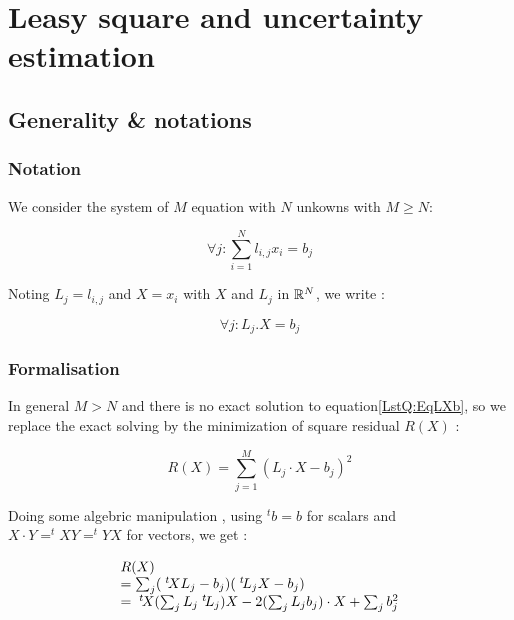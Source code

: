 \chapter{Leasy square and uncertainty estimation}
\label{Chap:LeastSquare}


\section{Generality \& notations}

\subsection{Notation}

We consider the system of $M$ equation with $N$ unkowns with $M\geq N$:

\begin{equation}
	\forall j : \sum_{i=1}^N l_{i,j} x_i = b_j
\end{equation}

Noting $L_j =  l_{i,j}$ and $X=x_i$ with $X$ and $L_j$ in $\mathbb{R}^N$, we write :

\begin{equation}
	\forall j :  L_j . X = b_j \label{LstQ:EqLXb}
\end{equation}

\subsection{Formalisation}

In general $M>N$ and there is no exact solution to equation\ref{LstQ:EqLXb},
so we replace the exact solving by the minimization of square residual $R(X)$ :


\begin{equation}
	R(X)  =  \sum_{j=1}^M (L_j \cdot X - b_j)^2
\end{equation}

Doing some algebric manipulation , using  $^t b= b$ for scalars and $X \cdot Y= ^t X Y = ^t Y X$ for vectors, we get :

\begin{equation}
\begin{array}{l}
	R(X)  \\
         =  \sum_j  (\; ^{t} \! X L_j -b_j)  ( \; ^{t} \! L_j  X -b_j) \\
	 = \; ^{t} \! X  (\sum_j L_j  \; ^{t} \! L_j) X - 2 (\sum_j L_j b_j) \cdot X + \sum_j b_j ^2
\end{array}
\end{equation}

